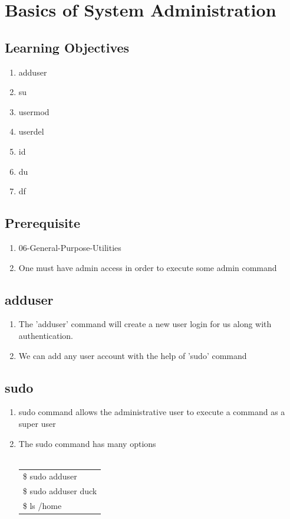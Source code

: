 \documentclass[12pt, a4paper]{report}
\begin{document}
\chapter{Basics of System Administration}
\section{Learning Objectives}
\begin{enumerate}
\item adduser
\item su
\item usermod
\item userdel
\item id
\item du
\item df
\end{enumerate}
\section{Prerequisite}
\begin{enumerate}
\item 06-General-Purpose-Utilities
\item One must have admin access in order to execute some admin command
\end{enumerate}
\section{adduser}
\begin{enumerate}
\item The 'adduser' command will create a new user login for us along with authentication.
\item We can add any user account with the help of 'sudo' command
\end{enumerate}
\section{sudo}
\begin{enumerate}
\item sudo command allows the administrative user to execute a command as a super user
\item The sudo command has many options\\
\\
\begin{tabular}{|l|}\hline
\$ sudo adduser\\
\$ sudo adduser duck\\
\$ ls /home\\ \hline
\end{tabular}
\end{enumerate}
\end{document}
